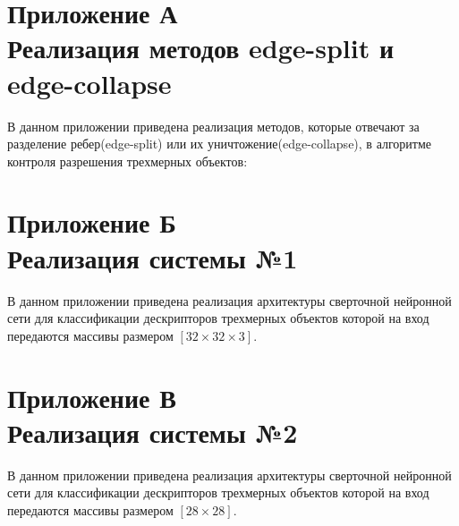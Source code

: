 \documentclass[14pt]{article}
\numberwithin{figure}{section}
\numberwithin{equation}{section}
\begin{document}
\newpage
{}
\section*{Приложение А\\Реализация методов edge-split и edge-collapse}\label{attachA}

В данном приложении приведена реализация методов, которые отвечают за разделение ребер(edge-split) или их уничтожение(edge-collapse), в алгоритме контроля разрешения трехмерных объектов:



\newpage
{}
\section*{Приложение Б\\Реализация системы №1}

В данном приложении приведена реализация архитектуры сверточной нейронной сети для классификации дескрипторов трехмерных объектов которой на вход передаются массивы размером $[32 \times 32 \times 3]$.

 

\newpage
{}
\section*{Приложение В\\Реализация системы №2}

В данном приложении приведена реализация архитектуры сверточной нейронной сети для классификации дескрипторов трехмерных объектов которой на вход передаются массивы размером $[28 \times 28]$.



\end{document}
